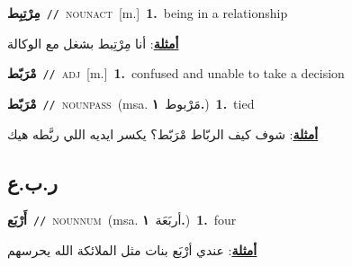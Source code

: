 \documentclass[10pt,a4paper,twoside]{article} %
\begin{document}
\begin{multicols}{2}
{{{{{{{{{{{{{\setlength\topsep{0pt}\textbf{\foreignlanguage{arabic}{مِرْتِبِط}}\ {\color{gray}\texttt{//}\color{black}}\ \textsc{noun\textunderscore act}\ [m.]\ \textbf{1.}~being in a relationship\  \begin{flushright}\color{gray}\foreignlanguage{arabic}{\textbf{\underline{\foreignlanguage{arabic}{أمثلة}}}: أنا مِرْتِبط بشغل مع الوكالة}\end{flushright}\color{black}} \vspace{2mm}

{\setlength\topsep{0pt}\textbf{\foreignlanguage{arabic}{مْرَبّط}}\ {\color{gray}\texttt{//}\color{black}}\ \textsc{adj}\ [m.]\ \textbf{1.}~confused and unable to take a decision\ 

{\setlength\topsep{0pt}\textbf{\foreignlanguage{arabic}{مْرَبّط}}\ {\color{gray}\texttt{//}\color{black}}\ \textsc{noun\textunderscore pass}\ \color{gray}(msa. \foreignlanguage{arabic}{مَرْبوط}~\foreignlanguage{arabic}{\textbf{١.}})\color{black}\ \textbf{1.}~tied\  \begin{flushright}\color{gray}\foreignlanguage{arabic}{\textbf{\underline{\foreignlanguage{arabic}{أمثلة}}}: شوف كيف الربّاط مْرَبّط؟ يكسر ايديه اللي ربَّطه هيك}\end{flushright}\color{black}} \vspace{2mm}

\vspace{-3mm}
\subsection*{\color{blue}\foreignlanguage{arabic}{ر.ب.ع}\color{blue}{}} 

{\setlength\topsep{0pt}\textbf{\foreignlanguage{arabic}{أَرْبَع}}\ {\color{gray}\texttt{//}\color{black}}\ \textsc{noun\textunderscore num}\ \color{gray}(msa. \foreignlanguage{arabic}{أربَعَة}~\foreignlanguage{arabic}{\textbf{١.}})\color{black}\ \textbf{1.}~four\  \begin{flushright}\color{gray}\foreignlanguage{arabic}{\textbf{\underline{\foreignlanguage{arabic}{أمثلة}}}: عندي أرْبَع بنات مثل الملائكة الله يحرسهم}\end{flushright}\color{black}} \vspace{2mm}

}}}}}}}}}}}}}
\end{multicols}
\end{document}
